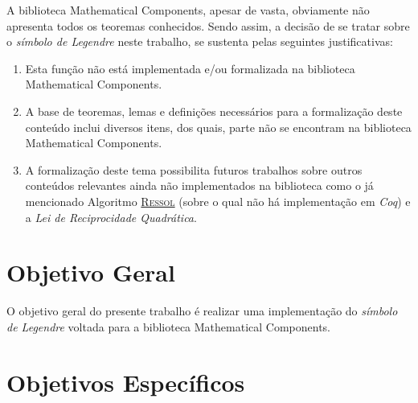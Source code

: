A biblioteca Mathematical Components, apesar de vasta, obviamente não apresenta todos os teoremas conhecidos. Sendo assim, a decisão de se tratar sobre o \textit{símbolo de Legendre} neste trabalho, se sustenta pelas seguintes justificativas:
\begin{enumerate}
    \item Esta função não está implementada e/ou formalizada na biblioteca Mathematical Components.
    \item A base de teoremas, lemas e definições necessários para a formalização deste conteúdo inclui diversos itens, dos quais, parte não se encontram na biblioteca Mathematical Components.
    \item A formalização deste tema possibilita futuros trabalhos sobre outros conteúdos relevantes ainda não implementados na biblioteca como o já mencionado Algoritmo \hyperref[algo:ressol]{\textsc{Ressol}} (sobre o qual não há implementação em \textit{Coq}) e a \textit{Lei de Reciprocidade Quadrática}. 
    
\end{enumerate}

\section{Objetivo Geral}

O objetivo geral do presente trabalho é realizar uma implementação do \textit{símbolo de Legendre} voltada para a biblioteca Mathematical Components.

\section{Objetivos Específicos}

